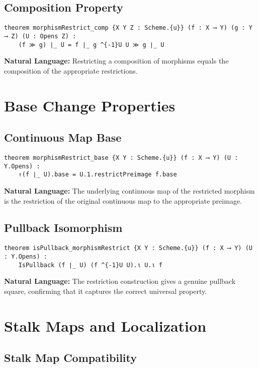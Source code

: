 \documentclass{article}
\theoremstyle{definition}
\begin{document}
\subsection{Composition Property}

\begin{lstlisting}
theorem morphismRestrict_comp {X Y Z : Scheme.{u}} (f : X ⟶ Y) (g : Y ⟶ Z) (U : Opens Z) :
    (f ≫ g) ∣_ U = f ∣_ g ^{-1}U U ≫ g ∣_ U
\end{lstlisting}

\textbf{Natural Language:} Restricting a composition of morphisms equals the composition of the appropriate restrictions.

\section{Base Change Properties}

\subsection{Continuous Map Base}

\begin{lstlisting}
theorem morphismRestrict_base {X Y : Scheme.{u}} (f : X ⟶ Y) (U : Y.Opens) :
    ⇑(f ∣_ U).base = U.1.restrictPreimage f.base
\end{lstlisting}

\textbf{Natural Language:} The underlying continuous map of the restricted morphism is the restriction of the original continuous map to the appropriate preimage.

\subsection{Pullback Isomorphism}

\begin{lstlisting}
theorem isPullback_morphismRestrict {X Y : Scheme.{u}} (f : X ⟶ Y) (U : Y.Opens) :
    IsPullback (f ∣_ U) (f ^{-1}U U).ι U.ι f
\end{lstlisting}

\textbf{Natural Language:} The restriction construction gives a genuine pullback square, confirming that it captures the correct universal property.

\section{Stalk Maps and Localization}

\subsection{Stalk Map Compatibility}
\end{document}
